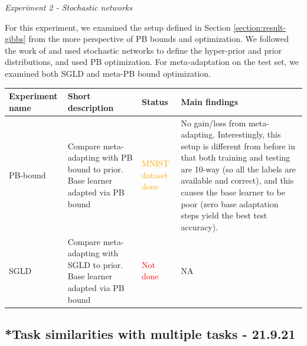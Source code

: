 \documentclass[letterpaper]{article}
\theoremstyle{definition}
\begin{document}
\emph{Experiment 2 - Stochastic networks}

For this experiment, we examined the setup defined in Section \ref{section:result-gibbs} from the more perspective of PB bounds and optimization. We followed the work of \cite{Amit2018} and used stochastic networks to define the hyper-prior and prior distributions, and used PB optimization. For meta-adaptation on the test set, we examined both SGLD and meta-PB bound optimization.

\begin{tabularx}{\textwidth}{|X|X | X | X|}
    \hline
     Experiment name & Short description & Status & Main findings \\
     \hline \hline
     PB-bound & Compare meta-adapting with PB bound to prior. Base learner adapted via PB bound & \textcolor{orange}{MNIST dataset done} & No gain/loss from meta-adapting. Interestingly, this setup is different from before in that both training and testing are 10-way (so all the labels are available and correct), and this causes the base learner to be poor (zero base adaptation steps yield the best test accuracy). \\
     \hline
     SGLD & Compare meta-adapting with SGLD to prior. Base learner adapted via PB bound  & \textcolor{red}{Not done} & NA \\
     \hline
\end{tabularx}


\subsection{*Task similarities with multiple tasks - 21.9.21}
\end{document}
